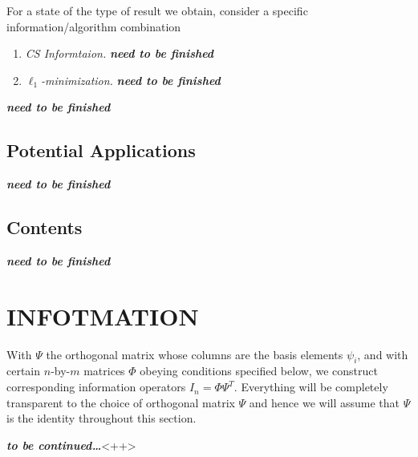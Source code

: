 For a state of the type of result we obtain, consider a specific information/algorithm combination
\begin{enumerate}
    \item \emph{CS Informtaion.} \emph{\textbf{\textcolor[rgb]{1,0,0}{need to be finished}}}
    \item \emph{$\ell_1$-minimization.} \emph{\textbf{\textcolor[rgb]{1,0,0}{need to be finished}}}
\end{enumerate}
\emph{\textbf{\textcolor[rgb]{1,0,0}{need to be finished}}}

\subsection{Potential Applications}
\emph{\textbf{\textcolor[rgb]{1,0,0}{need to be finished}}}
\subsection{Contents}
\emph{\textbf{\textcolor[rgb]{1,0,0}{need to be finished}}}
\section{INFOTMATION}
With $\Psi$ the orthogonal matrix whose columns are the basis elements $\psi_i$, and with certain $n$-by-$m$ matrices $\Phi$ obeying conditions specified below, we construct corresponding information operators \textcolor[rgb]{1,0,0}{$I_n = \Phi\Psi^T$}. Everything will be completely transparent to the choice of orthogonal matrix $\Psi$ and hence we will assume that $\Psi$ is the identity throughout this section.


\emph{\textbf{\textcolor[rgb]{1,0,0}{to be continued\dots}}}<++>
